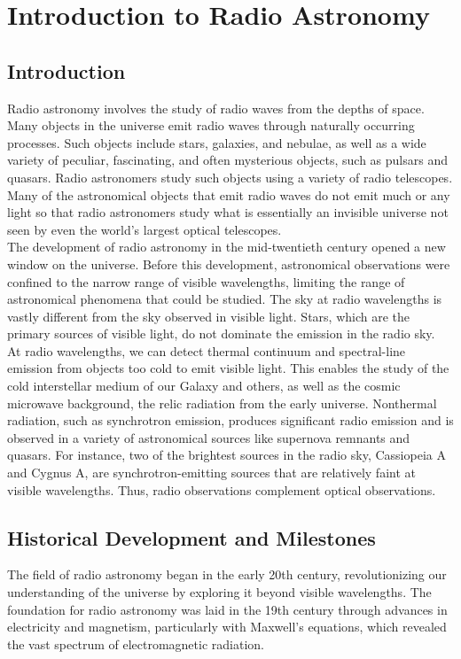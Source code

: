 \chapter{Introduction to Radio Astronomy}

\section{Introduction}
Radio astronomy involves the study of radio waves from the depths of space. Many objects in the universe emit radio waves through naturally occurring processes. Such objects include stars, galaxies, and nebulae, as well as a wide variety of peculiar, fascinating, and often mysterious objects, such as pulsars and quasars. Radio astronomers study such objects using a variety of radio telescopes. Many of the astronomical objects that emit radio waves do not emit much or any light so that radio astronomers study what is essentially an invisible universe not seen by even the world’s largest optical telescopes. \\

The development of radio astronomy in the mid-twentieth century opened a new window on the universe. Before this development, astronomical observations were confined to the narrow range of visible wavelengths, limiting the range of astronomical phenomena that could be studied. The sky at radio wavelengths is vastly different from the sky observed in visible light. Stars, which are the primary sources of visible light, do not dominate the emission in the radio sky. \\

At radio wavelengths, we can detect thermal continuum and spectral-line emission from objects too cold to emit visible light. This enables the study of the cold interstellar medium of our Galaxy and others, as well as the cosmic microwave background, the relic radiation from the early universe. Nonthermal radiation, such as synchrotron emission, produces significant radio emission and is observed in a variety of astronomical sources like supernova remnants and quasars. For instance, two of the brightest sources in the radio sky, Cassiopeia A and Cygnus A, are synchrotron-emitting sources that are relatively faint at visible wavelengths. Thus, radio observations complement optical observations. \\

\clearpage

\section{Historical Development and Milestones}
The field of radio astronomy began in the early 20th century, revolutionizing our understanding of the universe by exploring it beyond visible wavelengths. The foundation for radio astronomy was laid in the 19th century through advances in electricity and magnetism, particularly with Maxwell's equations, which revealed the vast spectrum of electromagnetic radiation.

